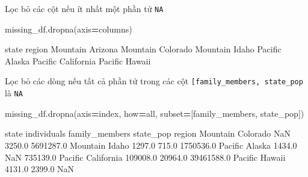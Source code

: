 \documentclass[
]{book}
\newenvironment{Shaded}{\begin{snugshade}}{\end{snugshade}}
\newcommand{\NormalTok}[1]{#1}
\newcommand{\OperatorTok}[1]{\textcolor[rgb]{0.81,0.36,0.00}{\textbf{#1}}}
\newcommand{\StringTok}[1]{\textcolor[rgb]{0.31,0.60,0.02}{#1}}
\begin{document}
Lọc bỏ các cột nếu ít nhất một phần tử \texttt{NA}

\begin{Shaded}
\begin{Highlighting}[]
\NormalTok{missing\_df.dropna(axis}\OperatorTok{=}\StringTok{\textquotesingle{}columns\textquotesingle{}}\NormalTok{)}
\end{Highlighting}
\end{Shaded}

\begin{Shaded}
\begin{Highlighting}[]
\NormalTok{               state}
\NormalTok{region              }
\NormalTok{Mountain     Arizona}
\NormalTok{Mountain    Colorado}
\NormalTok{Mountain       Idaho}
\NormalTok{Pacific       Alaska}
\NormalTok{Pacific   California}
\NormalTok{Pacific       Hawaii}
\end{Highlighting}
\end{Shaded}

Lọc bỏ các dòng nếu tất cả phần tử trong các cột \texttt{{[}\textquotesingle{}family\_members\textquotesingle{},\ \textquotesingle{}state\_pop\textquotesingle{}{]}} là \texttt{NA}

\begin{Shaded}
\begin{Highlighting}[]
\NormalTok{missing\_df.dropna(axis}\OperatorTok{=}\StringTok{\textquotesingle{}index\textquotesingle{}}\NormalTok{, how}\OperatorTok{=}\StringTok{\textquotesingle{}all\textquotesingle{}}\NormalTok{, subset}\OperatorTok{=}\NormalTok{[}\StringTok{\textquotesingle{}family\_members\textquotesingle{}}\NormalTok{, }\StringTok{\textquotesingle{}state\_pop\textquotesingle{}}\NormalTok{])}
\end{Highlighting}
\end{Shaded}

\begin{Shaded}
\begin{Highlighting}[]
\NormalTok{               state  individuals  family\_members   state\_pop}
\NormalTok{region                                                       }
\NormalTok{Mountain    Colorado          NaN          3250.0   5691287.0}
\NormalTok{Mountain       Idaho       1297.0           715.0   1750536.0}
\NormalTok{Pacific       Alaska       1434.0             NaN    735139.0}
\NormalTok{Pacific   California     109008.0         20964.0  39461588.0}
\NormalTok{Pacific       Hawaii       4131.0          2399.0         NaN}
\end{Highlighting}
\end{Shaded}
\end{document}
